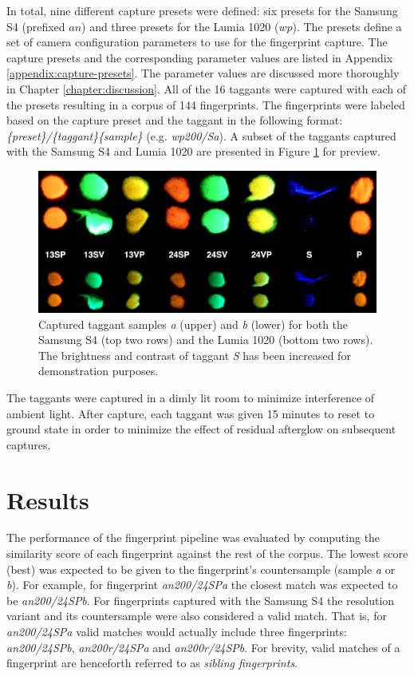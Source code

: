 \documentclass[thesis.tex]{subfiles}
\begin{document}
In total, nine different capture presets were defined: six presets for the Samsung S4 (prefixed $an$) and three presets for the Lumia 1020 ($wp$). The presets define a set of camera configuration parameters to use for the fingerprint capture. The capture presets and the corresponding parameter values are listed in Appendix \ref{appendix:capture-presets}. The parameter values are discussed more thoroughly in Chapter \ref{chapter:discussion}. All of the 16 taggants were captured with each of the presets resulting in a corpus of 144 fingerprints. The fingerprints were labeled based on the capture preset and the taggant in the following format: \emph{\{preset\}/\{taggant\}\{sample\}} (e.g. \emph{wp200/Sa}). A subset of the taggants captured with the Samsung S4 and Lumia 1020 are presented in Figure \ref{figure:taggants} for preview.


\begin{figure}[h]
\label{figure:taggants}
\centering \includegraphics[width=\textwidth,height=\textheight,keepaspectratio=true]{images/experiment/taggants}
\caption{Captured taggant samples \emph{a} (upper) and \emph{b} (lower) for both the Samsung S4 (top two rows) and the Lumia 1020 (bottom two rows). The brightness and contrast of taggant \emph{S} has been increased for demonstration purposes.}
\end{figure}
\clearpage

The taggants were captured in a dimly lit room to minimize interference of ambient light. After capture, each taggant was given 15 minutes to reset to ground state in order to minimize the effect of residual afterglow on subsequent captures.

\section{Results}
\label{chapter:results}

The performance of the fingerprint pipeline was evaluated by computing the similarity score of each fingerprint against the rest of the corpus. The lowest score (best) was expected to be given to the fingerprint's countersample (sample \emph{a} or \emph{b}). For example, for fingerprint \emph{an200/24SPa} the closest match was expected to be \emph{an200/24SPb}. For fingerprints captured with the Samsung S4 the resolution variant and its countersample were also considered a valid match. That is, for \emph{an200/24SPa} valid matches would actually include three fingerprints: \emph{an200/24SPb}, \emph{an200r/24SPa} and \emph{an200r/24SPb}. For brevity, valid matches of a fingerprint are henceforth referred to as \emph{sibling fingerprints}.
\end{document}

